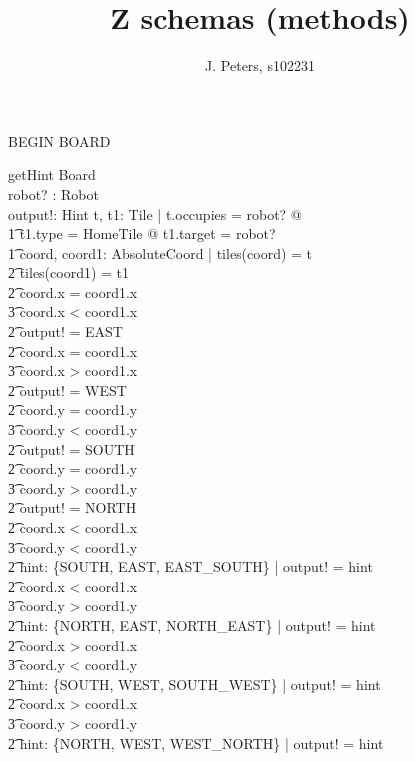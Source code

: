 \documentclass[a4paper,11pt]{article}
\begin{document}
\title{Z schemas (methods)}
\author{J. Peters, s102231}
\maketitle


BEGIN BOARD
\begin{schema}{getHint}
\Delta Board \\
robot? : Robot \\
output!: Hint
\where
\exists t, t1: Tile | t.occupies = robot? @\\ \t1
t1.type = HomeTile @ t1.target = robot? \\ \t1
\exists coord, coord1: AbsoluteCoord | tiles(coord) = t \\ \t2
tiles(coord1) = t1 \\ \t2
\IF coord.x = coord1.x \\ \t3
coord.x < coord1.x \\ \t2
\THEN output! = EAST \\ \t2
\IF coord.x = coord1.x \\ \t3
coord.x > coord1.x \\ \t2
\THEN output! = WEST \\ \t2
\IF coord.y = coord1.y \\ \t3
coord.y < coord1.y \\ \t2
\THEN output! = SOUTH \\ \t2
\IF coord.y = coord1.y \\ \t3
coord.y > coord1.y \\ \t2
\THEN output! = NORTH \\ \t2
\IF coord.x < coord1.x \\ \t3
coord.y < coord1.y \\ \t2
\THEN \exists hint: \{SOUTH, EAST, EAST\_SOUTH\} | output! = hint \\ \t2
\IF coord.x < coord1.x \\ \t3
coord.y > coord1.y \\ \t2
\THEN \exists hint: \{NORTH, EAST, NORTH\_EAST\} | output! = hint \\ \t2
\IF coord.x > coord1.x \\ \t3
coord.y < coord1.y \\ \t2
\THEN \exists hint: \{SOUTH, WEST, SOUTH\_WEST\} | output! = hint \\ \t2
\IF coord.x > coord1.x \\ \t3
coord.y > coord1.y \\ \t2
\THEN \exists hint: \{NORTH, WEST, WEST\_NORTH\} | output! = hint
\end{schema}
\end{document}
